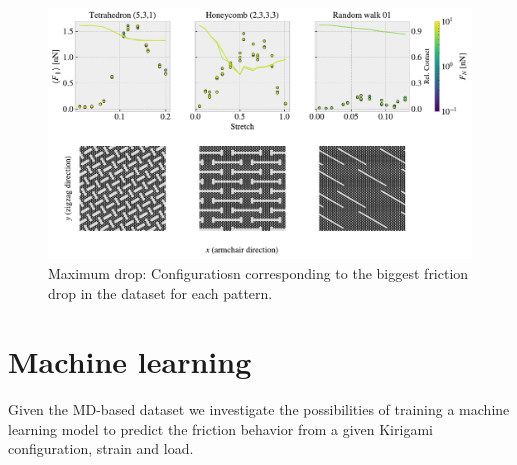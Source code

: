 \begin{figure}[H]
  \centering
  \includegraphics[width=\linewidth]{figures/stretch_profiles/PP_max_drop.pdf}
  \caption{Maximum drop: Configuratiosn corresponding to the biggest friction drop in the dataset for each pattern.}
  \label{fig:PP_max_drop}
\end{figure}  









\section{Machine learning}
Given the \acrshort{MD}-based dataset we investigate the possibilities of training a machine learning model to predict the friction behavior from a given Kirigami configuration, strain and load. 

